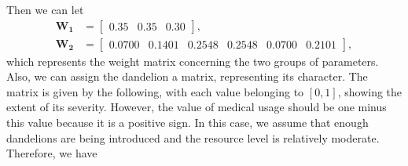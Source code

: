 \documentclass[12pt]{article}
\begin{document}
\begin{table}[h]
\renewcommand{\arraystretch}{1.5}
\centering
\caption{Judgement Matrix}
\end{table}
Then we can let
\begin{equation}
\begin{aligned}
\mathrm {\mathbf{W_1}} & =
\begin{bmatrix}
0.35&0.35&0.30

\end{bmatrix},\\[0.5em]
    \mathrm {\mathbf{W_2}} & =
    \begin{bmatrix}
 0.0700
    &0.1401
    &0.2548
    &0.2548    
    &0.0700
    &0.2101

\end{bmatrix},
\end{aligned}
\end{equation}
which represents the weight matrix concerning the two groups of parameters. Also, we can assign the dandelion a matrix, representing its character. The matrix is given by the following, with each value belonging to $[0,1]$, showing the extent of its severity. However, the value of medical usage should be one minus this value because it is a positive sign. In this case, we assume that enough dandelions are being introduced and the resource level is relatively moderate. Therefore, we have
\end{document}
